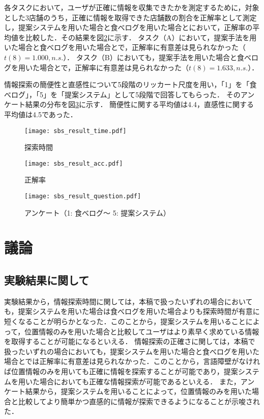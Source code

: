   各タスクにおいて，ユーザが正確に情報を収集できたかを測定するために，対象とした3店舗のうち，正確に情報を取得できた店舗数の割合を正解率として測定し，提案システムを用いた場合と食べログを用いた場合とにおいて，正解率の平均値を比較した．その結果を図\ref{fig:result_acc}に示す．
  タスク（A）において，提案手法を用いた場合と食べログを用いた場合とで，正解率に有意差は見られなかった（$t(8)=1.000, n.s.$）．
  タスク（B）においても，提案手法を用いた場合と食べログを用いた場合とで，正解率に有意差は見られなかった（$t(8)=1.633, n.s.$）．

  情報探索の簡便性と直感性について5段階のリッカート尺度を用い，「1」を「食べログ」，「5」を「提案システム」として5段階で回答してもらった．
  そのアンケート結果の分布を図\ref{fig:result_question}に示す．
  簡便性に関する平均値は4.4，直感性に関する平均値は4.5であった．

  \begin{figure}[tb]
    \begin{center}
      \texttt{[image: sbs\_result\_time.pdf]}
      \caption{探索時間}
      \label{fig:result_time}
    \end{center}
  \end{figure}
  \begin{figure}[tb]
    \begin{center}
      \texttt{[image: sbs\_result\_acc.pdf]}
      \caption{正解率}
      \label{fig:result_acc}
    \end{center}
  \end{figure}
  \begin{figure}[tb]
    \begin{center}
      \texttt{[image: sbs\_result\_question.pdf]}
      \caption{アンケート（1: 食べログ〜 5: 提案システム）}
      \label{fig:result_question}
    \end{center}
  \end{figure}

\section{議論}
\label{sec:discussion}
\subsection{実験結果に関して}
  実験結果から，情報探索時間に関しては，本稿で扱ったいずれの場合においても，提案システムを用いた場合は食べログを用いた場合よりも探索時間が有意に短くなることが明らかとなった．このことから，提案システムを用いることによって，位置情報のみを用いた場合と比較してユーザはより素早く求めている情報を取得することが可能になるといえる．
  情報探索の正確さに関しては，本稿で扱ったいずれの場合においても，提案システムを用いた場合と食べログを用いた場合とでは正解率に有意差は見られなかった．このことから，言語障壁がなければ位置情報のみを用いても正確に情報を探索することが可能であり，提案システムを用いた場合においても正確な情報探索が可能であるといえる．
  また，アンケート結果から，提案システムを用いることによって，位置情報のみを用いた場合と比較してより簡単かつ直感的に情報が探索できるようになることが示唆された．

